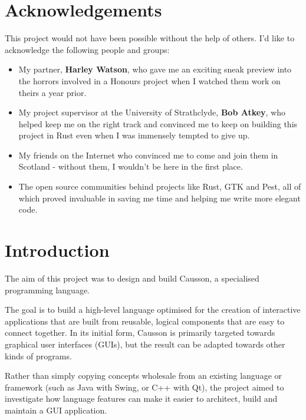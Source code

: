 \documentclass[11pt]{report}
\begin{document}
\chapter*{Acknowledgements}

This project would not have been possible without the help of others. I'd like to acknowledge the following people and groups:

\begin{itemize}
    \item My partner, \textbf{Harley Watson}, who gave me an exciting sneak preview into the horrors involved in a Honours project when I watched them work on theirs a year prior.
    
    \item My project supervisor at the University of Strathclyde, \textbf{Bob Atkey}, who helped keep me on the right track and convinced me to keep on building this project in Rust even when I was immensely tempted to give up.
    
    \item My friends on the Internet who convinced me to come and join them in Scotland - without them, I wouldn't be here in the first place.
    
    \item The open source communities behind projects like Rust, GTK and Pest, all of which proved invaluable in saving me time and helping me write more elegant code.
\end{itemize}

\tableofcontents

\chapter{Introduction} \label{chapIntro}

The aim of this project was to design and build Causson, a specialised programming language.

The goal is to build a high-level language optimised for the creation of interactive applications that are built from reusable, logical components that are easy to connect together. In its initial form, Causson is primarily targeted towards graphical user interfaces (GUIs), but the result can be adapted towards other kinds of programs.

Rather than simply copying concepts wholesale from an existing language or framework (such as Java with Swing, or C++ with Qt), the project aimed to investigate how language features can make it easier to architect, build and maintain a GUI application.
\end{document}
